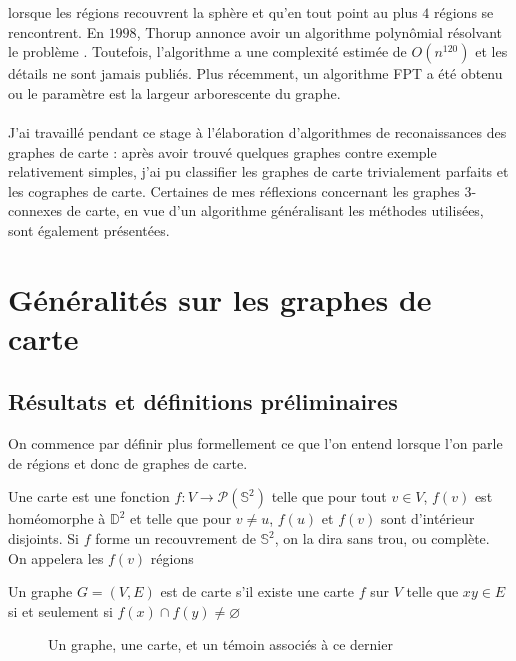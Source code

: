 \documentclass{scrartcl}
\begin{document}
\begin{flushleft}
lorsque les régions recouvrent la sphère et qu'en tout point au plus $4$ régions se rencontrent. En $1998$, Thorup annonce avoir un algorithme
polynômial résolvant le problème \cite{Thorup}. Toutefois, l'algorithme a une complexité estimée de $O(n^{120})$ \cite{n120} et les détails ne
sont jamais publiés. Plus récemment, un algorithme FPT a été obtenu \cite{FptMap} ou le paramètre est la largeur arborescente du graphe.
\\~\\
J'ai travaillé pendant ce stage à l'élaboration d'algorithmes de reconaissances des graphes de carte : après avoir trouvé quelques
graphes contre exemple relativement simples, j'ai pu classifier les graphes de carte trivialement parfaits et les cographes de carte.
Certaines de mes réflexions concernant les graphes $3$-connexes de carte, en vue d'un algorithme généralisant les méthodes utilisées,
sont également présentées.

\section{Généralités sur les graphes de carte}

\subsection{Résultats et définitions préliminaires}

On commence par définir plus formellement ce que l'on entend lorsque l'on parle de régions et donc de graphes de carte.

\begin{def*}[Carte]
    Une carte est une fonction $f : V \rightarrow \mathcal{P}(\mathbb{S}^2)$ telle que pour tout $v \in V$, $f(v)$
    est homéomorphe à $\mathbb{D}^2$ et telle que pour $v \neq u$, $f(u)$ et $f(v)$ sont d'intérieur disjoints. Si
    $f$ forme un recouvrement de $\mathbb{S}^2$, on la dira sans trou, ou complète. On appelera les $f(v)$ régions
\end{def*}

\begin{def*}
    Un graphe $G = (V, E)$ est de carte s'il existe une carte $f$ sur $V$ telle que $xy \in E$ si et seulement si
    $f(x) \cap f(y) \neq \varnothing$
\end{def*}

\begin{figure}[h]
    \caption{Un graphe, une carte, et un témoin associés à ce dernier}


\end{figure}
\end{flushleft}
\end{document}
